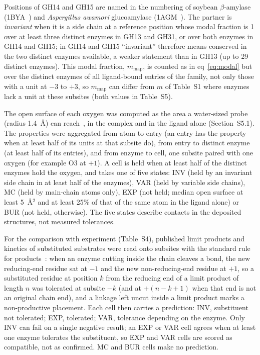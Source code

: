 \documentclass[preprint,12pt]{elsarticle}
\newcommand{\mmap}{m_\mathrm{map}}
\begin{document}
Positions of GH14 and GH15 are named in the numbering of soybean $\beta$-amylase
(1BYA~\citep{Mikami1994}) and \emph{Aspergillus awamori} glucoamylase (1AGM~\citep{Aleshin1994}). The partner is
\emph{invariant} when it is a side chain at a reference position whose modal fraction is 1 over at least three
distinct enzymes in GH13 and GH31, or over both enzymes in GH14 and GH15; in GH14 and GH15 ``invariant'' therefore
means conserved in the two distinct enzymes available, a weaker statement than in GH13 (up to 29 distinct enzymes). This modal fraction,
$\mmap$, is counted as in eq~\ref{eq:modal} but over the distinct enzymes of all ligand-bound entries of the family, not only
those with a unit at $-3$ to $+3$, so $\mmap$ can differ from $m$ of Table~S1 where enzymes lack a unit at these subsites
(both values in Table~S5).

The open surface of each oxygen was computed as the area a water-sized probe (radius
1.4~\AA) can reach~\citep{Shrake1973}, in the complex and in the ligand alone (Section~S5.1). The properties were aggregated from
atom to entry (an entry has the property when at least half of its units at that subsite do), from entry to
distinct enzyme (at least half of its entries), and from enzyme to cell, one subsite paired with one oxygen (for example O3 at $+1$). A cell is held when at least half of the distinct enzymes hold the oxygen, and takes one of five states: INV (held by an invariant side chain in at least half of the enzymes), VAR (held by variable side chains), MC (held by main-chain atoms only), EXP (not held; median open surface at least 5~\AA$^2$ and at least 25\% of that of the same atom in the ligand alone) or BUR (not held, otherwise). The five states describe contacts in the deposited structures, not measured tolerances.

For the comparison with experiment (Table~S4), published limit products and kinetics of substituted substrates were
read onto subsites with the standard rule for products~\citep{Davies1997}: when an enzyme cutting inside the chain cleaves a bond, the new
reducing-end residue sat at $-1$ and the new non-reducing-end residue at $+1$, so a substituted residue at position
$k$ from the reducing end of a limit product of length $n$ was tolerated at subsite $-k$ (and at $+(n-k+1)$ when that
end is not an original chain end), and a linkage left uncut inside a limit product marks a non-productive placement.
Each cell then carries a prediction: INV, substituent not tolerated; EXP, tolerated; VAR, tolerance depending on the
enzyme. Only INV can fail on a single negative result; an EXP or VAR cell agrees when at least one enzyme tolerates
the substituent, so EXP and VAR cells are scored as compatible, not as confirmed. MC and BUR cells make no prediction.
\end{document}
